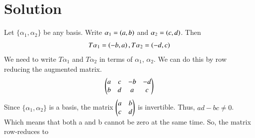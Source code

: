 \documentclass[journal,12pt,twocolumn]{IEEEtran}
\begin{document}
\section{Solution}
Let $\{\alpha_1,\alpha_2\}$ be any basis. Write $\alpha_1=\left(a,b\right)$ and $\alpha_2=\left(c,d\right)$. Then 
\begin{align}
    T\alpha_1=\left(-b,a\right), T\alpha_2=\left(-d,c\right)
\end{align}
We need to write $T\alpha_1$ and $T\alpha_2$ in terms of $\alpha_1$, $\alpha_2$. We can do this by row reducing the augmented matrix.
\begin{align}
    \begin{pmatrix}a & c & -b & -d \\ b & d & a & c\end{pmatrix}
\end{align}
Since $\{\alpha_1,\alpha_2\}$ is a basis, the matrix $\begin{pmatrix}a & b \\ c & d\end{pmatrix}$ is invertible. Thus, $ad-bc \neq 0$. Which means that both a and b cannot be zero at the same time. So, the matrix row-reduces to 
\end{document}
